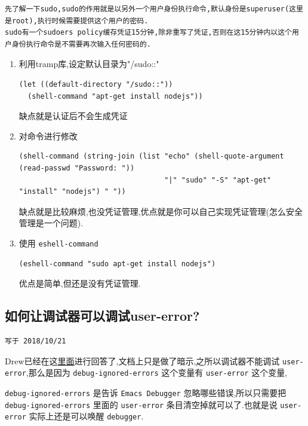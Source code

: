 \documentclass[11pt]{article}
\begin{document}
\begin{verbatim}
先了解一下sudo,sudo的作用就是以另外一个用户身份执行命令,默认身份是superuser(这里是root),执行时候需要提供这个用户的密码.
sudo有一个sudoers policy缓存凭证15分钟,除非重写了凭证,否则在这15分钟内以这个用户身份执行命令是不需要再次输入任何密码的.
\end{verbatim}

\begin{enumerate}
\item 利用tramp库,设定默认目录为"/sudo::"

\begin{verbatim}
(let ((default-directory "/sudo::"))
  (shell-command "apt-get install nodejs"))
\end{verbatim}

缺点就是认证后不会生成凭证

\item 对命令进行修改

\begin{verbatim}
(shell-command (string-join (list "echo" (shell-quote-argument (read-passwd "Password: "))
                                  "|" "sudo" "-S" "apt-get" "install" "nodejs") " "))
\end{verbatim}

缺点就是比较麻烦,也没凭证管理,优点就是你可以自己实现凭证管理(怎么安全管理是一个问题).

\item 使用 \texttt{eshell-command}

\begin{verbatim}
(eshell-command "sudo apt-get install nodejs")
\end{verbatim}

优点是简单,但还是没有凭证管理.
\end{enumerate}


\subsection{如何让调试器可以调试user-error?}
\label{sec:org53cb559}
\begin{verbatim}
写于 2018/10/21
\end{verbatim}

Drew已经在这\href{https://superuser.com/questions/782313/emacs-make-debug-on-error-catch-errors/782365}{里面}进行回答了,文档上只是做了暗示,之所以调试器不能调试 \texttt{user-error},那么是因为 \texttt{debug-ignored-errors} 这个变量有 \texttt{user-error} 这个变量,

\texttt{debug-ignored-errors} 是告诉 \texttt{Emacs Debugger} 忽略哪些错误,所以只需要把 \texttt{debug-ignored-errors} 里面的 \texttt{user-error} 条目清空掉就可以了.也就是说 \texttt{user-error} 实际上还是可以唤醒 \texttt{debugger}.
\end{document}

